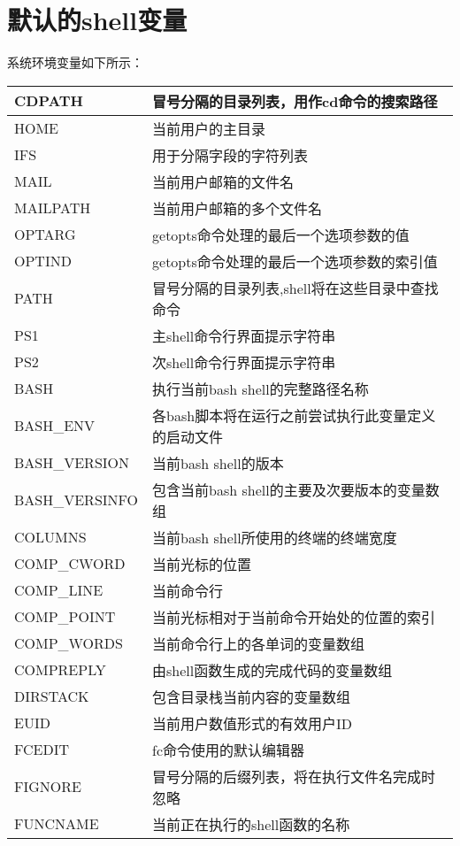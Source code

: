 \documentclass[a4paper,left=2.5cm,right=2.5cm,11pt]{article}
\begin{document}
\section{默认的shell变量}
	系统环境变量如下所示：
	\begin{longtable}{p{3cm}p{9cm}}
	\hline
	CDPATH & 冒号分隔的目录列表，用作cd命令的搜索路径 \\
	\hline
	HOME & 当前用户的主目录 \\
	\hline
	IFS & 用于分隔字段的字符列表 \\
	\hline
	MAIL & 当前用户邮箱的文件名 \\
	\hline
	MAILPATH & 当前用户邮箱的多个文件名 \\
	\hline
	OPTARG & getopts命令处理的最后一个选项参数的值 \\
	\hline
	OPTIND & getopts命令处理的最后一个选项参数的索引值 \\
	\hline
	PATH & 冒号分隔的目录列表,shell将在这些目录中查找命令 \\
	\hline
	PS1 & 主shell命令行界面提示字符串 \\
	\hline
	PS2 & 次shell命令行界面提示字符串 \\
	\hline
	BASH & 执行当前bash shell的完整路径名称 \\
	\hline
	BASH\_ENV & 各bash脚本将在运行之前尝试执行此变量定义的启动文件 \\
	\hline
	BASH\_VERSION & 当前bash shell的版本 \\
	\hline
	BASH\_VERSINFO & 包含当前bash shell的主要及次要版本的变量数组 \\
	\hline
	COLUMNS & 当前bash shell所使用的终端的终端宽度 \\
	\hline
	COMP\_CWORD & 当前光标的位置 \\
	\hline
	COMP\_LINE & 当前命令行 \\
	\hline
	COMP\_POINT & 当前光标相对于当前命令开始处的位置的索引 \\
	\hline
	COMP\_WORDS & 当前命令行上的各单词的变量数组 \\
	\hline
	COMPREPLY & 由shell函数生成的完成代码的变量数组 \\
	\hline
	DIRSTACK & 包含目录栈当前内容的变量数组 \\
	\hline
	EUID & 当前用户数值形式的有效用户ID \\
	\hline
	FCEDIT & fc命令使用的默认编辑器 \\
	\hline
	FIGNORE & 冒号分隔的后缀列表，将在执行文件名完成时忽略 \\
	\hline
	FUNCNAME & 当前正在执行的shell函数的名称 \\

\end{longtable}
\end{document}
